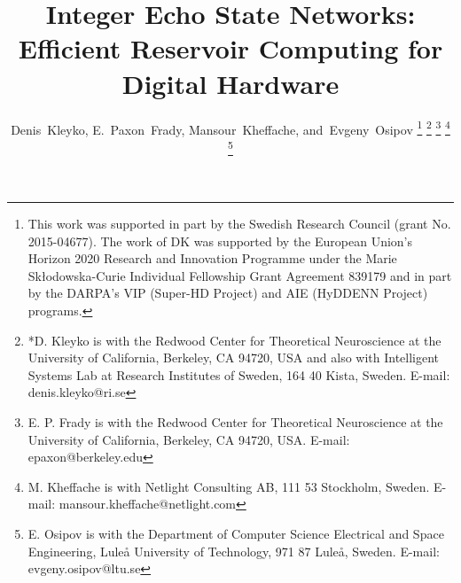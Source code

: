 \documentclass[journal]{IEEEtran}
\begin{document}
\title{Integer Echo State Networks: Efficient Reservoir Computing for Digital Hardware}



\author{Denis~Kleyko,
        E.~Paxon~Frady,
        Mansour~Kheffache,
        and~Evgeny~Osipov %
\thanks{%
This work  was  supported in part  by the Swedish Research Council (grant No. 2015-04677). 
The work of DK was supported by the European Union’s Horizon 2020 Research and Innovation Programme under the Marie Skłodowska-Curie Individual Fellowship Grant Agreement 839179 and in part by the DARPA’s VIP (Super-HD Project) and AIE (HyDDENN Project) programs.
}
\thanks{\mbox{*}D. Kleyko is with the Redwood Center for Theoretical Neuroscience at the University of California, Berkeley, CA 94720, USA and also with Intelligent Systems Lab at Research Institutes of Sweden, 164 40 Kista, Sweden. \mbox{E-mail}: \mbox{denis.kleyko@ri.se}}%
\thanks{E. P. Frady is with the Redwood Center for Theoretical Neuroscience at the University of California, Berkeley, CA 94720, USA. \mbox{E-mail}: \mbox{epaxon@berkeley.edu}
}%
\thanks{M. Kheffache is with Netlight Consulting AB, 111 53 Stockholm, Sweden. \mbox{E-mail}: \mbox{mansour.kheffache@netlight.com}}%
\thanks{E. Osipov is with the Department of Computer  Science Electrical and Space Engineering, Lule\aa{} University of Technology, 971 87 Lule\aa{}, Sweden. \mbox{E-mail}: \mbox{evgeny.osipov@ltu.se} }%
 }%
\end{document}
